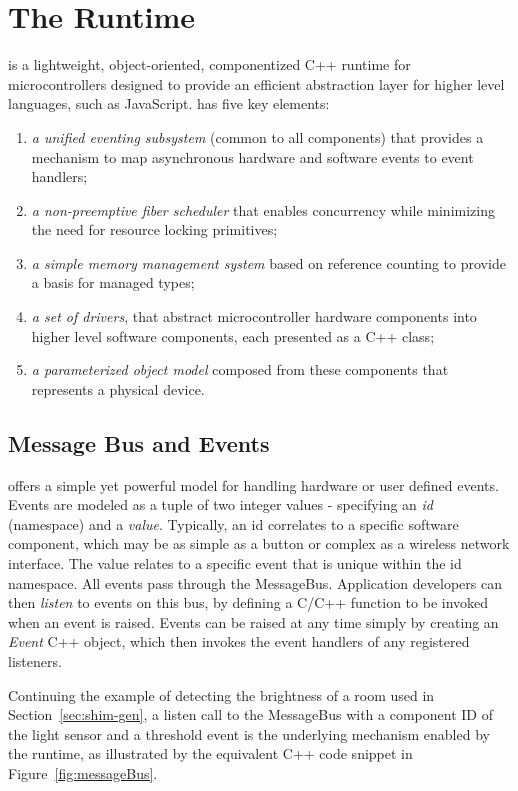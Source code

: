 \section{The \CO Runtime}
\label{sec:codal}

\CO is a lightweight, object-oriented, componentized C++ runtime for microcontrollers designed to provide an efficient abstraction layer for higher level languages, such as JavaScript. \CO has five key elements:

\begin{enumerate}
\item \emph{a unified eventing subsystem} (common to all components) that provides a mechanism to map asynchronous hardware and software events to event handlers;
\item \emph{a non-preemptive fiber scheduler} that enables concurrency while minimizing the need for resource locking primitives;
\item \emph{a simple memory management system} based on reference counting to provide a basis for managed types;
\item \emph{a set of drivers}, that abstract microcontroller hardware components into higher level software components, each presented as a C++ class;
\item \emph{a parameterized object model} composed from these components that represents a physical device.
\end{enumerate}

\subsection{Message Bus and Events}

\CO offers a simple yet powerful model for handling hardware or user defined events. Events are modeled as a tuple of two integer values - specifying an \emph{id} (namespace) and a \emph{value}.
Typically, an id correlates to a specific software component, which may be as simple as a button or complex as a wireless network interface. The value relates to a specific event that is unique within the id namespace. All events pass through the \CO MessageBus. Application developers can then \emph{listen} to events on this bus, by defining a C/C++ function to be invoked when an event is raised. Events can be raised at any time simply by creating an \emph{Event} C++ object, which then invokes the event handlers of any registered listeners.

Continuing the example of detecting the brightness of a room used in Section~\ref{sec:shim-gen}, a listen call to the MessageBus with a component ID of the light sensor and a threshold event is the underlying mechanism enabled by the runtime, as illustrated by the equivalent C++ code snippet in Figure~\ref{fig:messageBus}.

